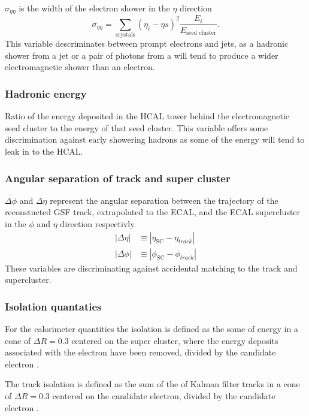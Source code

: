 $\sigma_{\eta\eta}$ is the width of the electron shower in the $\eta$
direction
\begin{equation}
\sigma_{\eta\eta} = 
\sum_{\text{crystals}} \left(\eta_{i} - \eta{s}\right)^{2}
\frac{E_{i}}{E_{\text{seed cluster}}}.
\end{equation}
This variable descriminates between prompt electrons and jets, as a hadronic
shower from a jet or a pair of photons from a \Ppizero will tend to produce a
wider electromagnetic shower than an electron.

\subsubsection{Hadronic energy}
Ratio of the energy deposited in the HCAL tower behind the electromagnetic seed
cluster to the energy of that seed cluster. This variable offers some
discrimination against early showering hadrons as some of the energy will tend
to leak in to the HCAL.

\subsubsection{Angular separation of track and super cluster}
$\Delta\phi$ and $\Delta\eta$ represent the angular separation between the
trajectory of the reconstucted GSF track, extrapolated to the ECAL, and the ECAL supercluster in the $\phi$
and $\eta$ direction respectivly.
\begin{align}
|\Delta\eta| &\equiv |\eta_{\text{SC}} - \eta_{track}|\\
|\Delta\phi| &\equiv |\phi_{\text{SC}} - \phi_{track}|
\end{align}
These variables are discriminating against accidental matching to the track and
supercluster.

\subsubsection{Isolation quantaties}
For the calorimeter quantities the isolation is defined as the some of energy in
a cone of $\Delta R = 0.3 $ centered on the super cluster, where the energy
deposits associated with the electron have been removed, divided by the
candidate electron \Pt.

The track isolation is defined as the sum of the \Pt of Kalman filter tracks in
a cone of $\Delta R = 0.3 $ centered on the candidate electron, divided by the
candidate electron \Pt.

